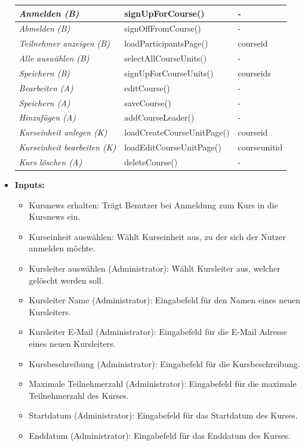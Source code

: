 \begin{itemize}
\begin{center}
\begin{longtable}{|p{4cm} |p{6cm} | p{4cm}|}
					\textit{Anmelden (B)} & signUpForCourse() & - \\ \hline
					\textit{Abmelden (B)} &  signOffFromCourse() & - \\ \hline
					\textit{Teilnehmer anzeigen (B)} & loadParticipantsPage() & courseid \\ \hline
					\textit{Alle auswählen (B)} & selectAllCourseUnits() & - \\ \hline
					\textit{Speichern (B)} & signUpForCourseUnits() & courseids \\ \hline
					\textit{Bearbeiten (A)} & editCourse() & - \\ \hline
					\textit{Speichern (A)} & saveCourse() & - \\ \hline
					\textit{Hinzufügen (A)} & addCourseLeader() & - \\ \hline
					\textit{Kurseinheit anlegen (K)} & loadCreateCourseUnitPage() & courseid \\ \hline
					\textit{Kurseinheit bearbeiten (K)} & loadEditCourseUnitPage() & courseunitid \\ \hline
					\textit{Kurs löschen (A)} & deleteCourse() & - \\ \hline
				\end{longtable}
			\end{center}
			\item \textbf{Inputs:}
			\begin{itemize}
				\item Kursnews erhalten: Trägt Benutzer bei Anmeldung zum Kurs in die Kursnews ein.
				\item Kurseinheit auswählen: Wählt Kurseinheit aus, zu der sich der Nutzer anmelden möchte.
				\item Kursleiter auswählen (Administrator): Wählt Kursleiter aus, welcher gelöscht werden soll.
				\item Kursleiter Name (Administrator): Eingabefeld für den Namen eines neuen Kursleiters.
				\item Kursleiter E-Mail (Administrator): Eingabefeld für die E-Mail Adresse eines neuen Kursleiters.
				\item Kursbeschreibung (Administrator): Eingabefeld für die Kursbeschreibung.
				\item Maximale Teilnehmerzahl (Administrator): Eingabefeld für die maximale Teilnehmerzahl des Kurses.
				\item Startdatum (Administrator): Eingabefeld für das Startdatum des Kurses.
				\item Enddatum (Administrator): Eingabefeld für das Enddatum des Kurses.
			\end{itemize}
				\begin{center}
					\begin{longtable}{|p{3cm} |p{9cm} |}
						

\end{longtable}
\end{center}
\end{itemize}
